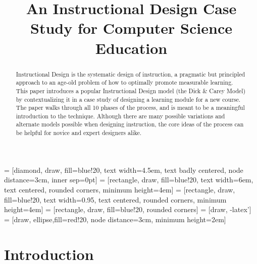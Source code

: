 \documentclass{sig-alternate}
\begin{document}
 = [diamond, draw, fill=blue!20, 
    text width=4.5em, text badly centered, node distance=3cm, inner sep=0pt]
 = [rectangle, draw, fill=blue!20, 
    text width=6em, text centered, rounded corners, minimum height=4em]
 = [rectangle, draw, fill=blue!20, 
    text width=0.95\columnwidth, text centered, rounded corners, minimum height=4em]
 = [rectangle, draw, fill=blue!20, 
    rounded corners]
 = [draw, -latex']
 = [draw, ellipse,fill=red!20, node distance=3cm,
    minimum height=2em]

\title{An Instructional Design Case Study for Computer Science Education}
\author{
}

\maketitle
\begin{abstract}
Instructional Design is the systematic design of instruction, a pragmatic but principled approach to an age-old problem of how to optimally promote measurable learning.
This paper introduces a popular Instructional Design model (the Dick \& Carey Model) by contextualizing it in a case study of designing a learning module for a new course.
The paper walks through all 10 phases of the process, and is meant to be a meaningful introduction to the technique.
Although there are many possible variations and alternate models possible when designing instruction, the core ideas of the process can be helpful for novice and expert designers alike.
\end{abstract}




\section{Introduction}
\end{document}
